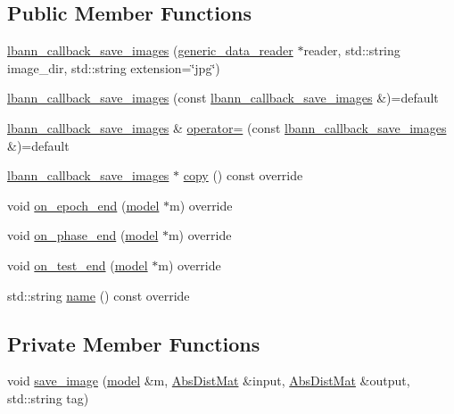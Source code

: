\subsection*{Public Member Functions}
\begin{DoxyCompactItemize}
\item 
\hyperlink{classlbann_1_1lbann__callback__save__images_a19825aa8f1bc28114a5269bee6c88758}{lbann\+\_\+callback\+\_\+save\+\_\+images} (\hyperlink{classlbann_1_1generic__data__reader}{generic\+\_\+data\+\_\+reader} $\ast$reader, std\+::string image\+\_\+dir, std\+::string extension=\char`\"{}jpg\char`\"{})
\item 
\hyperlink{classlbann_1_1lbann__callback__save__images_a3a01aa79c40d7d6f9120211d45141d23}{lbann\+\_\+callback\+\_\+save\+\_\+images} (const \hyperlink{classlbann_1_1lbann__callback__save__images}{lbann\+\_\+callback\+\_\+save\+\_\+images} \&)=default
\item 
\hyperlink{classlbann_1_1lbann__callback__save__images}{lbann\+\_\+callback\+\_\+save\+\_\+images} \& \hyperlink{classlbann_1_1lbann__callback__save__images_a79fcd1489f0a5239303578d892c7a8b9}{operator=} (const \hyperlink{classlbann_1_1lbann__callback__save__images}{lbann\+\_\+callback\+\_\+save\+\_\+images} \&)=default
\item 
\hyperlink{classlbann_1_1lbann__callback__save__images}{lbann\+\_\+callback\+\_\+save\+\_\+images} $\ast$ \hyperlink{classlbann_1_1lbann__callback__save__images_a6abba6b6a94080c09f52f1aac8773461}{copy} () const override
\item 
void \hyperlink{classlbann_1_1lbann__callback__save__images_aa540916eef9b95db68889a8a7426779c}{on\+\_\+epoch\+\_\+end} (\hyperlink{classlbann_1_1model}{model} $\ast$m) override
\item 
void \hyperlink{classlbann_1_1lbann__callback__save__images_a4591438de0b52467988e2bd34b55c0dd}{on\+\_\+phase\+\_\+end} (\hyperlink{classlbann_1_1model}{model} $\ast$m) override
\item 
void \hyperlink{classlbann_1_1lbann__callback__save__images_a44d0f0113133d6fd8944d8b7702ea786}{on\+\_\+test\+\_\+end} (\hyperlink{classlbann_1_1model}{model} $\ast$m) override
\item 
std\+::string \hyperlink{classlbann_1_1lbann__callback__save__images_ae3e0f20308b83a3a1b2fe0ba1acbd072}{name} () const override
\end{DoxyCompactItemize}
\subsection*{Private Member Functions}
\begin{DoxyCompactItemize}
\item 
void \hyperlink{classlbann_1_1lbann__callback__save__images_ab84c4d511a4614ca90644d12dc77edee}{save\+\_\+image} (\hyperlink{classlbann_1_1model}{model} \&m, \hyperlink{base_8hpp_a9a697a504ae84010e7439ffec862b470}{Abs\+Dist\+Mat} \&input, \hyperlink{base_8hpp_a9a697a504ae84010e7439ffec862b470}{Abs\+Dist\+Mat} \&output, std\+::string tag)
\end{DoxyCompactItemize}
